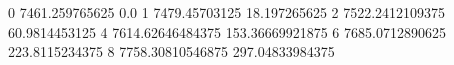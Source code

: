 0 7461.259765625 0.0
1 7479.45703125 18.197265625
2 7522.2412109375 60.9814453125
4 7614.62646484375 153.36669921875
6 7685.0712890625 223.8115234375
8 7758.30810546875 297.04833984375
